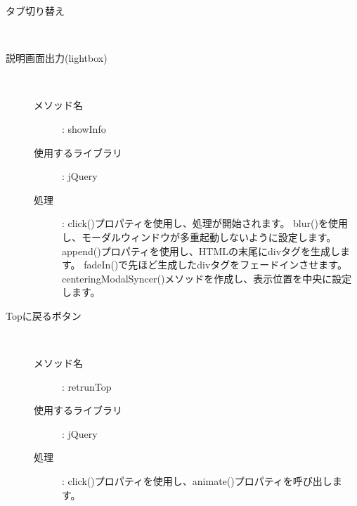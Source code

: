\documentclass[a4j,titlepage]{jarticle}
\begin{document}
\begin{description}
\item[タブ切り替え]~\\

\item[説明画面出力(lightbox)]~
  \begin{description}
    \item [メソッド名] : showInfo
    \item [使用するライブラリ] : jQuery
    \item [処理] : click()プロパティを使用し、処理が開始されます。
    blur()を使用し、モーダルウィンドウが多重起動しないように設定します。
    append()プロパティを使用し、HTMLの末尾にdivタグを生成します。
    fadeIn()で先ほど生成したdivタグをフェードインさせます。
    centeringModalSyncer()メソッドを作成し、表示位置を中央に設定します。
  \end{description}

\item[Topに戻るボタン]~
  \begin{description}
    \item [メソッド名] : retrunTop
    \item [使用するライブラリ] : jQuery
    \item [処理] : click()プロパティを使用し、animate()プロパティを呼び出します。
  \end{description}



\end{description}
\end{document}
